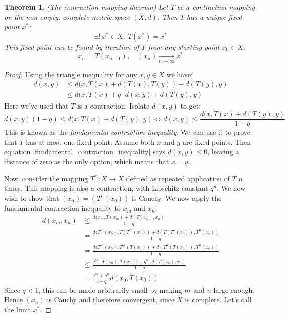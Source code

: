 \documentclass[12pt, a4paper]{article}
\newtheorem{theorem}{Theorem}[section]
\numberwithin{equation}{section}
\begin{document}
\begin{theorem}
(The contraction mapping theorem) Let $T$ be a contraction mapping on the non-empty, complete metric space $(X,d)$. Then $T$ has a unique fixed-point $x^*$:
\begin{equation}
\exists !\ x^*\in X:\ T(x^*)=x^*
\end{equation}
This fixed-point can be found by iteration of $T$ from any starting point $x_0\in X$:
\begin{equation}
x_n=T(x_{n-1}),\quad (x_n)\underset{n\rightarrow\infty}{\rightarrow} x^*
\end{equation}
\end{theorem}
\begin{proof}
Using the triangle inequality for any $x,y\in X$ we have:
\begin{align}
d(x,y)&\le d(x,T(x)+d(T(x),T(y))+d(T(y),y)\\
&\le d(x,T(x)+q\cdot d(x,y)+d(T(y),y)
\end{align}
Here we've used that $T$ is a contraction. Isolate $d(x,y)$ to get:
\begin{equation}
d(x,y)(1-q)\le d(x,T(x)+d(T(y),y)\Leftrightarrow d(x,y)\le\frac{d(x,T(x)+d(T(y),y)}{1-q}
\label{fundamental_contraction_inequality}
\end{equation}
This is known as the \textit{fundamental contraction inequality}. We can use it to prove that $T$ has at most one fixed-point: Assume both $x$ and $y$ are fixed points. Then equation \ref{fundamental_contraction_inequality} says $d(x,y)\le 0$, leaving a distance of zero as the only option, which means that $x=y$.

Now, consider the mapping $T^n: X\rightarrow X$ defined as repeated application of $T$ $n$ times. This mapping is also a contraction, with Lipschitz constant $q^n$. We now wish to show that $(x_n)=(T^n(x_0))$ is Cauchy. We now apply the fundamental contraction inequality to $x_m$ and $x_n$:
\begin{align}
d(x_m,x_n)&\le\frac{d(x_m,T(x_m)+d(T(x_n),x_n)}{1-q}\\
&=\frac{d(T^m(x_0),T(T^m(x_0))+d(T(T^n(x_0)),T^n(x_0))}{1-q}\\
&=\frac{d(T^m(x_0),T^m(T(x_0))+d(T^n(T(x_0)),T^n(x_0))}{1-q}\\
&\le\frac{q^m\cdot d(x_0),T(x_0))+q^n\cdot d(T(x_0),x_0)}{1-q}\\
&=\frac{q^m+q^n}{1-q}d(x_0,T(x_0))
\end{align}
Since $q<1$, this can be made arbitrarily small by making $m$ and $n$ large enough. Hence $(x_n)$ is Cauchy and therefore convergent, since $X$ is complete. Let's call the limit $x^*$.


\end{proof}
\end{document}
